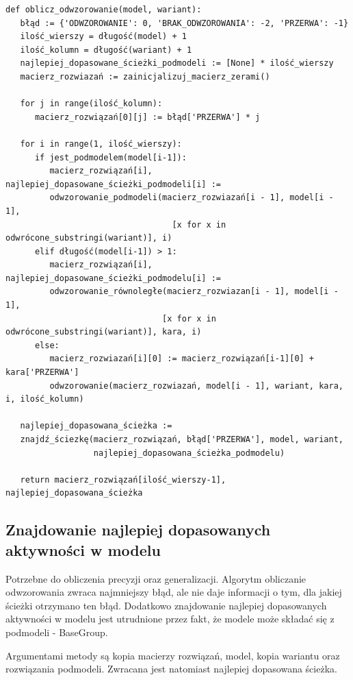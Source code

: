\lstset{caption=Obliczanie odwzorowania, captionpos=b}
\lstset{label=src:alignment_calculation, frame=single}
\begin{lstlisting}[escapeinside=``]
def oblicz_odwzorowanie(model, wariant):
   błąd := {'ODWZOROWANIE': 0, 'BRAK_ODWZOROWANIA': -2, 'PRZERWA': -1}
   ilość_wierszy = długość(model) + 1
   ilość_kolumn = długość(wariant) + 1
   najlepiej_dopasowane_ścieżki_podmodeli := [None] * ilość_wierszy
   macierz_rozwiazań := zainicjalizuj_macierz_zerami()

   for j in range(ilość_kolumn):
      macierz_rozwiązań[0][j] := błąd['PRZERWA'] * j

   for i in range(1, ilość_wierszy):
      if jest_podmodelem(model[i-1]):
         macierz_rozwiązań[i], najlepiej_dopasowane_ścieżki_podmodeli[i] := 
         odwzorowanie_podmodeli(macierz_rozwiazań[i - 1], model[i - 1],
                                  [x for x in odwrócone_substringi(wariant)], i)
      elif długość(model[i-1]) > 1:
         macierz_rozwiązań[i], najlepiej_dopasowane_ścieżki_podmodelu[i] := 
         odwzorowanie_równoległe(macierz_rozwiazan[i - 1], model[i - 1],
                                [x for x in odwrócone_substringi(wariant)], kara, i)
      else:
         macierz_rozwiazań[i][0] := macierz_rozwiązań[i-1][0] + kara['PRZERWA']
         odwzorowanie(macierz_rozwiazań, model[i - 1], wariant, kara, i, ilość_kolumn)

   najlepiej_dopasowana_ścieżka := 
   znajdź_ściezkę(macierz_rozwiązań, błąd['PRZERWA'], model, wariant, 
                  najlepiej_dopasowana_ścieżka_podmodelu)

   return macierz_rozwiązań[ilość_wierszy-1], najlepiej_dopasowana_ścieżka
\end{lstlisting}

\subsection{Znajdowanie najlepiej dopasowanych aktywności w modelu}
Potrzebne do obliczenia precyzji oraz generalizacji. Algorytm obliczanie odwzorowania zwraca najmniejszy błąd, ale nie daje informacji o tym, dla jakiej ścieżki otrzymano ten błąd. Dodatkowo znajdowanie najlepiej dopasowanych aktywności w modelu jest utrudnione przez fakt, że modele może składać się z podmodeli - BaseGroup. 

Argumentami metody są kopia macierzy rozwiązań, model, kopia wariantu oraz rozwiązania podmodeli. Zwracana jest natomiast najlepiej dopasowana ścieżka.

